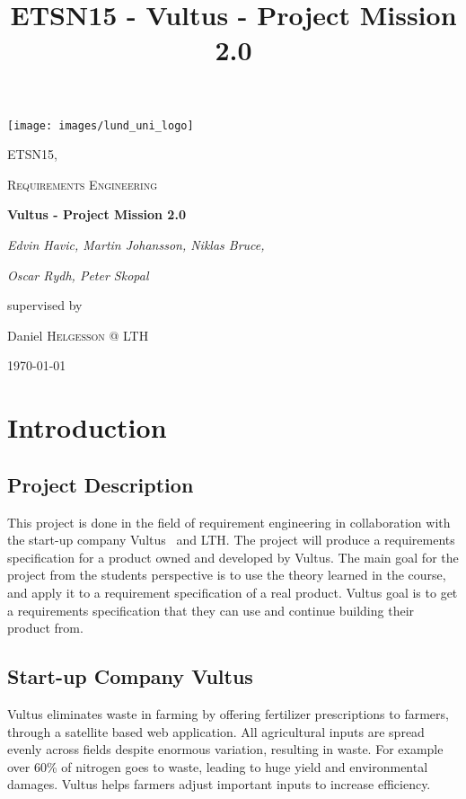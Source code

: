 \documentclass[a4paper]{article}
\title{ETSN15 - Vultus - Project Mission 2.0}
\begin{document}
\begin{titlepage}
	\centering
	\texttt{[image: images/lund\_uni\_logo]}\par\vspace{1cm}
	\vspace{1cm}
	{\scshape\Large ETSN15, \par}
    {\scshape\Large Requirements Engineering \par}
	\vspace{1.5cm}
	{\huge\bfseries Vultus - Project Mission 2.0 \par}
	\vspace{2cm}
	{\Large\itshape Edvin Havic, Martin Johansson, Niklas Bruce, \par}
    {\Large\itshape Oscar Rydh, Peter Skopal \par}
    \vspace{2cm}
	supervised by\par
	Daniel \textsc{Helgesson} @ LTH\par
    \vspace{2cm}

	{\large \today\par}
\end{titlepage}

\tableofcontents
\newpage

\section{Introduction}
\subsection{Project Description}
This project is done in the field of requirement engineering in collaboration with the start-up company Vultus~\cite{vultus} and LTH. The project will produce a requirements specification for a product owned and developed by Vultus. The main goal for the project from the students perspective is to use the theory learned in the course, and apply it to a requirement specification of a real product. Vultus goal is to get a requirements specification that they can use and continue building their product from.

\subsection{Start-up Company Vultus}
Vultus eliminates waste in farming by offering fertilizer prescriptions to farmers, through a satellite based web application. All agricultural inputs are spread evenly across fields despite enormous variation, resulting in waste. For example over 60\% of nitrogen goes to waste, leading to huge yield and environmental damages. Vultus helps farmers adjust important inputs to increase efficiency.
\end{document}
